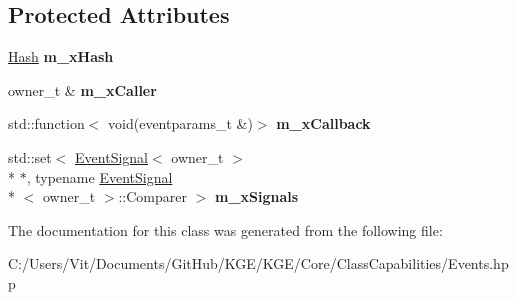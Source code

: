 \subsection*{Protected Attributes}
\begin{DoxyCompactItemize}
\item 
\hypertarget{class_k_g_e_1_1_event_a896140405a443b76b39503fc29adcd16}{\hyperlink{class_k_g_e_1_1_hash}{Hash} {\bfseries m\-\_\-x\-Hash}}\label{class_k_g_e_1_1_event_a896140405a443b76b39503fc29adcd16}

\item 
\hypertarget{class_k_g_e_1_1_event_a510003f7bed85cfdbca5400105576832}{owner\-\_\-t \& {\bfseries m\-\_\-x\-Caller}}\label{class_k_g_e_1_1_event_a510003f7bed85cfdbca5400105576832}

\item 
\hypertarget{class_k_g_e_1_1_event_ae0ecaf668869d285e28a5ecce70b634d}{std\-::function$<$ void(eventparams\-\_\-t \&)$>$ {\bfseries m\-\_\-x\-Callback}}\label{class_k_g_e_1_1_event_ae0ecaf668869d285e28a5ecce70b634d}

\item 
\hypertarget{class_k_g_e_1_1_event_a25cb534b76a8d499622660e332692800}{std\-::set$<$ \hyperlink{class_k_g_e_1_1_event_signal}{Event\-Signal}$<$ owner\-\_\-t $>$\\*
 $\ast$, typename \hyperlink{class_k_g_e_1_1_event_signal}{Event\-Signal}\\*
$<$ owner\-\_\-t $>$\-::Comparer $>$ {\bfseries m\-\_\-x\-Signals}}\label{class_k_g_e_1_1_event_a25cb534b76a8d499622660e332692800}

\end{DoxyCompactItemize}


The documentation for this class was generated from the following file\-:\begin{DoxyCompactItemize}
\item 
C\-:/\-Users/\-Vit/\-Documents/\-Git\-Hub/\-K\-G\-E/\-K\-G\-E/\-Core/\-Class\-Capabilities/Events.\-hpp\end{DoxyCompactItemize}
